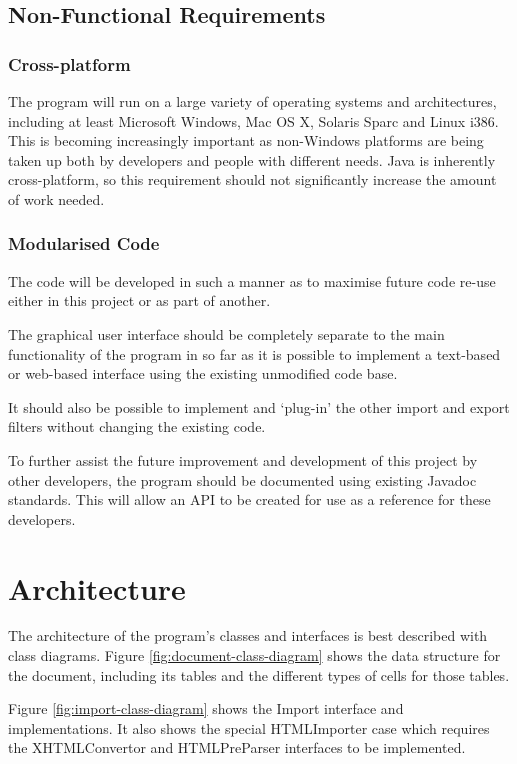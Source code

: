 \subsection{Non-Functional Requirements}

\subsubsection{Cross-platform}

The program will run on a large variety of operating systems and architectures,
including at least Microsoft Windows, Mac OS X, Solaris Sparc and Linux i386.
This is becoming increasingly important as non-Windows platforms are being
taken up both by developers and people with different needs. Java is inherently
cross-platform, so this requirement should not significantly increase the
amount of work needed.

\subsubsection{Modularised Code}

The code will be developed in such a manner as to maximise future code re-use
either in this project or as part of another.

The graphical user interface should be completely separate to the main
functionality of the program in so far as it is possible to implement a
text-based or web-based interface using the existing unmodified code base.

It should also be possible to implement and `plug-in' the other import and
export filters without changing the existing code.

To further assist the future improvement and development of this project by
other developers, the program should be documented using existing Javadoc
standards. This will allow an API to be created for use as a reference for
these developers.

\section{Architecture}

The architecture of the program's classes and interfaces is best described
with class diagrams. Figure \ref{fig:document-class-diagram} shows the
data structure for the document, including its tables and the different
types of cells for those tables.

Figure \ref{fig:import-class-diagram} shows the Import interface and 
implementations. It also shows the special HTMLImporter case which
requires the XHTMLConvertor and HTMLPreParser interfaces to be
implemented.

